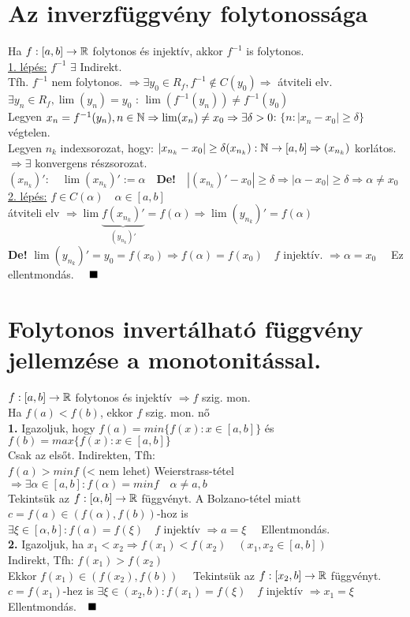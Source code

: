 \documentclass[a4paper,12pt]{article}
\begin{document}
\section{Az inverzfüggvény folytonossága}
	\tetel Ha $f:[a,b]\to\mathbb{R}$ folytonos és injektív, akkor $f^{-1}$ is folytonos.\\[0.1cm]
	\biz \underline{1. lépés:} $f^{-1}$  $\exists$ Indirekt.\\[0.1cm] Tfh. $f^{-1}$ nem folytonos. $\Rightarrow\exists y_{0}\in R_f, f^{-1}\notin C(y_0)\Rightarrow$ átviteli elv.\\[0.1cm] $\exists y_n\in R_f, \lim(y_n)=y_0$ : $\lim(f^{-1}(y_n)) \neq f^{-1}(y_0)$\\[0.1cm] Legyen $x_n=f^{-1}(y_n), n\in\mathbb{N}\Rightarrow\lim(x_n)\neq x_0\Rightarrow\exists\delta >0$: $\{n:|x_n-x_0|\geq\delta\}$ végtelen.\\[0.1cm] Legyen $n_k$ indexsorozat, hogy: $|x_{n_k}-x_0| \geq\delta\\[0.1cm](x_{n_k}):\mathbb{N}\to[a,b]\Rightarrow(x_{n_k})$ korlátos. $\Rightarrow\exists$ konvergens részsorozat.\\[0.1cm] $(x_{n_k})':\quad\lim (x_{n_k})':=\alpha\quad$\textbf{De!}$\quad|(x_{n_k})'-x_0|\geq\delta\Rightarrow|\alpha-x_0|\geq\delta\Rightarrow\alpha\neq x_0$\\[0.1cm]\underline{2. lépés:} $f\in C(\alpha)\quad\alpha\in[a,b]$\\[0.1cm] átviteli elv $\Rightarrow\lim\underbrace{f (x_{n_k})'}_{(y_{n_k})'}=f(\alpha)\Rightarrow \lim(y_{n_k})'=f(\alpha)$\\[0.1cm]\textbf{De!} $\lim(y_{n_k})'=y_0=f(x_0) \Rightarrow f(\alpha)=f(x_0)\quad f$ injektív. $\Rightarrow \alpha = x_0\quad$ Ez ellentmondás. $\quad\blacksquare$
\newpage
\section{Folytonos invertálható függvény jellemzése a monotonitással.}
\tetel $f:[a,b]\to\mathbb{R}$ folytonos és injektív $\Rightarrow f$ szig. mon.\\[0.1cm]
\biz Ha $f(a)<f(b)$, ekkor $f$ szig. mon. nő\\[0.1cm] \textbf{1.} Igazoljuk, hogy $f(a)=min\{f(x):x\in[a,b]\}$ és $f(b)=max\{f(x):x\in[a,b]\}$\\[0.1cm] Csak az elsőt. Indirekten, Tfh:\\[0.1cm] $f(a)>min f$ (< nem lehet) Weierstrass-tétel $\Rightarrow\exists\alpha\in[a,b]:f(\alpha)=min f\quad\alpha\neq a,b$\\[0.1cm] Tekintsük az $f:[\alpha,b]\to\mathbb{R}$ függvényt. A Bolzano-tétel miatt $c=f(a)\in(f(\alpha),f(b))$-hoz is\\[0.1cm] $\exists\xi\in[\alpha,b]:f(a)=f(\xi)\quad f$ injektív $\Rightarrow a=\xi\quad$ Ellentmondás.\\[0.1cm]\textbf{2.} Igazoljuk, ha $x_1<x_2\Rightarrow f(x_1)<f(x_2)\quad(x_1,x_2\in[a,b])$\\[0.1cm]Indirekt, Tfh: $f(x_1)>f(x_2)$\\[0.1cm]Ekkor $f(x_1)\in(f(x_2),f(b))\quad$ Tekintsük az $f:[x_2,b] \to\mathbb{R}$ függvényt.\\[0.1cm]$c=f(x_1)$-hez is $\exists\xi\in(x_2,b):f(x_1)=f(\xi)\quad f$ injektív $\Rightarrow x_1=\xi\quad$ Ellentmondás.$\quad\blacksquare$
\end{document}
